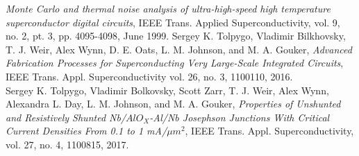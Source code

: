 \begin{thebibliography}{99}
  {\em Monte Carlo and thermal noise analysis of ultra-high-speed high
  temperature superconductor digital circuits},
  IEEE Trans. Applied Superconductivity,
  vol. 9, no. 2, pt. 3, pp. 4095-4098, June 1999.
Sergey K. Tolpygo, Vladimir Bilkhovsky, T. J. Weir,
  Alex Wynn, D. E. Oats, L. M. Johnson, and M. A. Gouker, {\em Advanced
  Fabrication Processes for Superconducting Very Large-Scale Integrated
  Circuits}, IEEE Trans.  Appl. Superconductivity vol.  26, no.  3,
  1100110, 2016.\\
  Sergey K. Tolpygo, Vladimir Bolkovsky, Scott Zarr, T. J. Weir,   
  Alex Wynn, Alexandra L. Day, L. M. Johnson, and M. A. Gouker,     
  {\em Properties of Unshunted and Resistively Shunted Nb/$AlO_X$-Al/Nb
  Josephson Junctions With Critical Current Densities From 0.1 to 1
  mA/${\mu}m^2$}, IEEE Trans. Appl. Superconductivity, vol. 27, no. 4,
  1100815, 2017.
\end{thebibliography}

